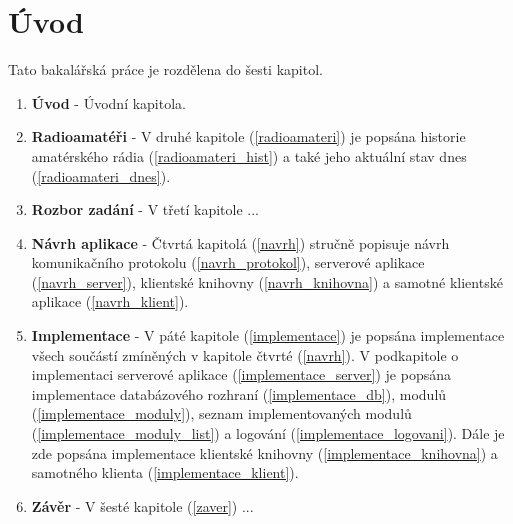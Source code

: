 \chapter{Úvod}

Tato bakalářská  práce je rozdělena do šesti kapitol.

\begin{enumerate}
  \item \textbf{Úvod} - Úvodní kapitola.
  \item \textbf{Radioamatéři} - V druhé kapitole (\ref{radioamateri}) je popsána historie amatérského rádia
(\ref{radioamateri_hist}) a také jeho aktuální stav dnes (\ref{radioamateri_dnes}).
  \item \textbf{Rozbor zadání} - V třetí kapitole ...
  \item \textbf{Návrh aplikace} - Čtvrtá kapitolá (\ref{navrh}) stručně popisuje návrh 
komunikačního protokolu (\ref{navrh_protokol}), serverové aplikace (\ref{navrh_server}), klientské knihovny 
(\ref{navrh_knihovna}) a samotné klientské aplikace (\ref{navrh_klient}).
  \item \textbf{Implementace} - V páté kapitole (\ref{implementace}) je popsána implementace všech součástí
zmíněných v kapitole čtvrté (\ref{navrh}). V podkapitole o implementaci serverové aplikace (\ref{implementace_server})
je popsána implementace databázového rozhraní (\ref{implementace_db}), modulů (\ref{implementace_moduly}),
seznam implementovaných modulů (\ref{implementace_moduly_list}) a logování (\ref{implementace_logovani}). Dále je
zde popsána implementace klientské knihovny (\ref{implementace_knihovna}) a samotného klienta (\ref{implementace_klient}).
  \item \textbf{Závěr} - V šesté kapitole (\ref{zaver}) ...
\end{enumerate}

